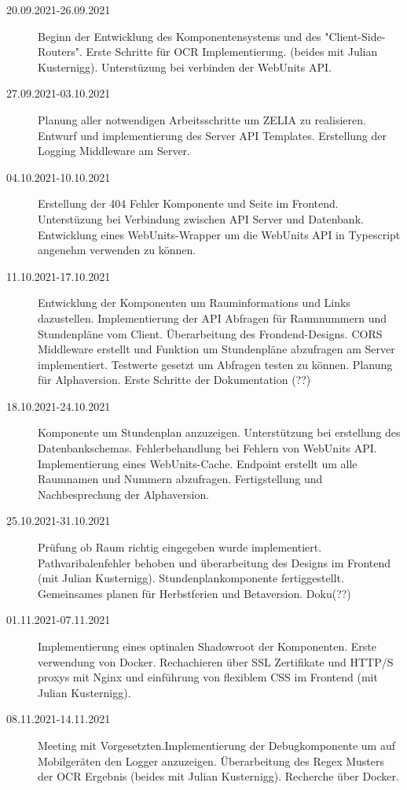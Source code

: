 
\begin{description}
    \item[20.09.2021-26.09.2021] Beginn der Entwicklung des Komponentensystems und des "Client-Side-Routers". Erste Schritte für OCR Implementierung. (beides mit Julian Kusternigg). Unterstüzung bei verbinden der WebUnits API.
    \item[27.09.2021-03.10.2021] Planung aller notwendigen Arbeitsschritte um ZELIA zu realisieren. Entwurf und implementierung des Server API Templates. Erstellung der Logging Middleware am Server.
    \item[04.10.2021-10.10.2021] Erstellung der 404 Fehler Komponente und Seite im Frontend. Unterstüzung bei Verbindung zwischen API Server und Datenbank. Entwicklung eines WebUnits-Wrapper um die WebUnits API in Typescript angenehm verwenden zu können.
    \item[11.10.2021-17.10.2021] Entwicklung der Komponenten um Rauminformations und Links dazustellen. Implementierung der API Abfragen für Raumnummern und Stundenpläne vom Client. Überarbeitung des Frondend-Designs. CORS Middleware erstellt und Funktion um Stundenpläne abzufragen am Server implementiert. Testwerte gesetzt um Abfragen testen zu können. Planung für Alphaversion. Erste Schritte der Dokumentation (??)
    \item[18.10.2021-24.10.2021] Komponente um Stundenplan anzuzeigen. Unterstützung bei erstellung des Datenbankschemas. Fehlerbehandlung bei Fehlern von WebUnits API. Implementierung eines WebUnits-Cache. Endpoint erstellt um alle Raumnamen und Nummern abzufragen. Fertigstellung und Nachbesprechung der Alphaversion.
    \item[25.10.2021-31.10.2021] Prüfung ob Raum richtig eingegeben wurde implementiert. Pathvaribalenfehler behoben und überarbeitung des Designs im Frontend (mit Julian Kusternigg). Stundenplankomponente fertiggestellt. Gemeinsames planen für Herbstferien und Betaversion. Doku(??)
    \item[01.11.2021-07.11.2021] Implementierung eines optinalen Shadowroot der Komponenten. Erste verwendung von Docker. Rechachieren über SSL Zertifikate und HTTP/S proxys mit Nginx und einführung von flexiblem CSS im Frontend (mit Julian Kusternigg).
    \item[08.11.2021-14.11.2021] Meeting mit Vorgesetzten.Implementierung der Debugkomponente um auf Mobilgeräten den Logger anzuzeigen. Überarbeitung des Regex Musters der OCR Ergebnis (beides mit Julian Kusternigg). Recherche über Docker.

\end{description}
